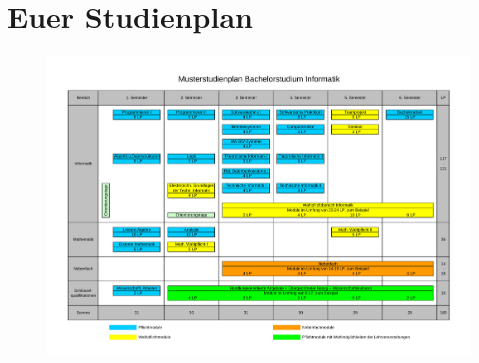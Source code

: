 \section{Euer Studienplan}

\onecolumn
\begin{figure}[h]
  \centering\includegraphics[angle=90,totalheight=\textheight, width=\textwidth ]{texte/studienplan/studienplan.pdf}
\end{figure}
\twocolumn

